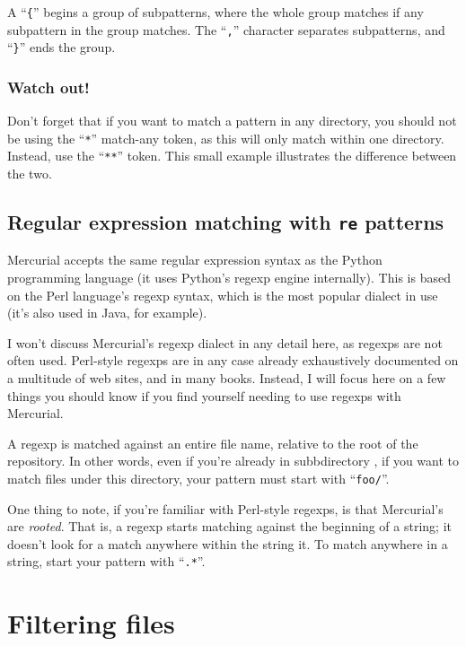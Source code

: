 A ``\texttt{\{}'' begins a group of subpatterns, where the whole group
matches if any subpattern in the group matches.  The ``\texttt{,}''
character separates subpatterns, and ``\texttt{\}}'' ends the group.

\subsubsection{Watch out!}

Don't forget that if you want to match a pattern in any directory, you
should not be using the ``\texttt{*}'' match-any token, as this will
only match within one directory.  Instead, use the ``\texttt{**}''
token.  This small example illustrates the difference between the two.

\subsection{Regular expression matching with \texttt{re} patterns}

Mercurial accepts the same regular expression syntax as the Python
programming language (it uses Python's regexp engine internally).
This is based on the Perl language's regexp syntax, which is the most
popular dialect in use (it's also used in Java, for example).

I won't discuss Mercurial's regexp dialect in any detail here, as
regexps are not often used.  Perl-style regexps are in any case
already exhaustively documented on a multitude of web sites, and in
many books.  Instead, I will focus here on a few things you should
know if you find yourself needing to use regexps with Mercurial.

A regexp is matched against an entire file name, relative to the root
of the repository.  In other words, even if you're already in
subbdirectory , if you want to match files under this
directory, your pattern must start with ``\texttt{foo/}''.

One thing to note, if you're familiar with Perl-style regexps, is that
Mercurial's are \emph{rooted}.  That is, a regexp starts matching
against the beginning of a string; it doesn't look for a match
anywhere within the string it.  To match anywhere in a string, start
your pattern with ``\texttt{.*}''.

\section{Filtering files}

